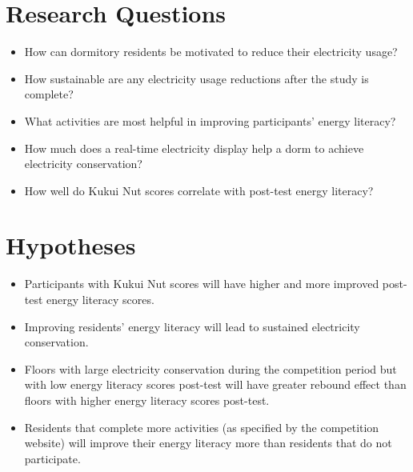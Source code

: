 \section{Research Questions}

\begin{itemize}

\item How can dormitory residents be motivated to reduce their electricity usage?

\item How sustainable are any electricity usage reductions after the study is complete?

\item What activities are most helpful in improving participants' energy literacy?

\item How much does a real-time electricity display help a dorm to achieve electricity conservation?

\item How well do Kukui Nut scores correlate with post-test energy literacy?

\end{itemize}


\section{Hypotheses}

\begin{itemize}

\item Participants with Kukui Nut scores will have higher and more improved post-test energy literacy scores.

\item Improving residents' energy literacy will lead to sustained electricity conservation.

\item Floors with large electricity conservation during the competition period but with low energy literacy scores post-test will have greater rebound effect than floors with higher energy literacy scores post-test.

\item Residents that complete more activities (as specified by the competition website) will improve their energy literacy more than residents that do not participate.

\end{itemize}